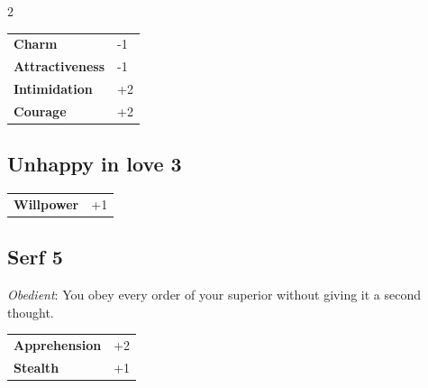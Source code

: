 \begin{multicols}{2}
\begin{tcolorbox}
\begin{tabular}{@{}ll@{}}
    \textbf{Charm} & -1\\
    \textbf{Attractiveness} & -1\\
    \textbf{Intimidation} & +2\\
    \textbf{Courage} & +2\\
\end{tabular}


\end{tcolorbox}

\begin{tcolorbox}
    \subsection*{Unhappy in love \hfill \small{3 }}
    \tcblower




\begin{tabular}{@{}ll@{}}
    \textbf{Willpower} & +1\\
\end{tabular}


\end{tcolorbox}

\begin{tcolorbox}
    \subsection*{Serf \hfill \small{5 }}
    \tcblower
\textit{Obedient}: You obey every order of your superior without giving it a second thought.


\vspace{3mm}

\begin{tabular}{@{}ll@{}}
    \textbf{Apprehension} & +2\\
    \textbf{Stealth} & +1\\
\end{tabular}



\end{tcolorbox}
\end{multicols}
